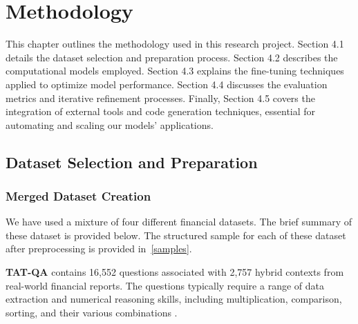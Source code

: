 \documentclass[logo,msc]{infthesis}           %
\begin{document}


\chapter{Methodology}
This chapter outlines the methodology used in this research project. Section 4.1 details the dataset selection and preparation process. Section 4.2 describes the computational models employed. Section 4.3 explains the fine-tuning techniques applied to optimize model performance. Section 4.4 discusses the evaluation metrics and iterative refinement processes. Finally, Section 4.5 covers the integration of external tools and code generation techniques, essential for automating and scaling our models' applications.

\section{Dataset Selection and Preparation}

\subsection{Merged Dataset Creation}
\label{sec4.1.1}
We have used a mixture of four different financial datasets. The brief summary of these dataset is provided below. The structured sample for each of these dataset after preprocessing is provided in~\ref{samples}. 

\textbf{TAT-QA } contains 16,552 questions associated with 2,757 hybrid contexts from real-world financial reports. The questions typically require a range of data extraction and numerical reasoning skills, including multiplication, comparison, sorting, and their various combinations \cite{zhu-etal-2021-tat}.
\end{document}
